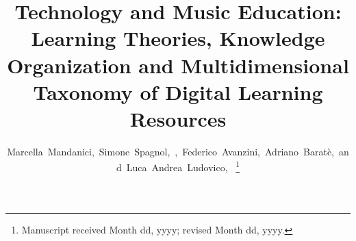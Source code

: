 \documentclass[10pt,journal,compsoc]{IEEEtran}
\begin{document}
%
\title{Technology and Music Education: Learning Theories, Knowledge Organization and Multidimensional Taxonomy of Digital Learning Resources}

%
%
%
%

\author{Marcella~Mandanici,~Simone~Spagnol,~,~Federico~Avanzini,~Adriano~Barat\`e,~and~Luca~Andrea~Ludovico,~%
\thanks{Manuscript received Month dd, yyyy; revised Month dd, yyyy.}}


% 
%
\end{document}
